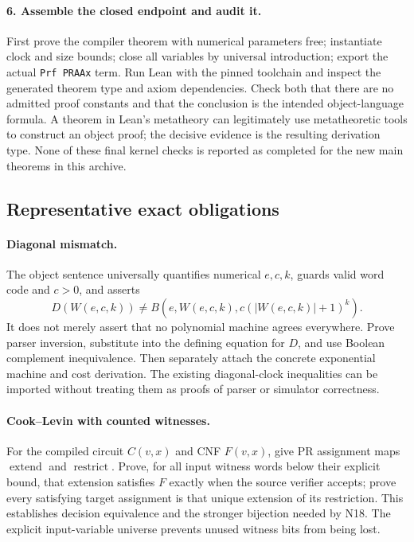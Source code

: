\paragraph{6. Assemble the closed endpoint and audit it.}
First prove the compiler theorem with numerical parameters free; instantiate clock and size bounds; close all variables by universal introduction; export the actual \texttt{Prf PRAAx} term. Run Lean with the pinned toolchain and inspect the generated theorem type and axiom dependencies. Check both that there are no admitted proof constants and that the conclusion is the intended object-language formula. A theorem in Lean's metatheory can legitimately use metatheoretic tools to construct an object proof; the decisive evidence is the resulting derivation type. None of these final kernel checks is reported as completed for the new main theorems in this archive.

\subsection{Representative exact obligations}
\paragraph{Diagonal mismatch.}
The object sentence universally quantifies numerical $e,c,k$, guards valid word code and $c>0$, and asserts
\[
 D(W(e,c,k))\ne B(e,W(e,c,k),c(|W(e,c,k)|+1)^k).
\]
It does not merely assert that no polynomial machine agrees everywhere. Prove parser inversion, substitute into the defining equation for $D$, and use Boolean complement inequivalence. Then separately attach the concrete exponential machine and cost derivation. The existing diagonal-clock inequalities can be imported without treating them as proofs of parser or simulator correctness.

\paragraph{Cook--Levin with counted witnesses.}
For the compiled circuit $C(v,x)$ and CNF $F(v,x)$, give PR assignment maps $\operatorname{extend}$ and $\operatorname{restrict}$. Prove, for all input witness words below their explicit bound, that extension satisfies $F$ exactly when the source verifier accepts; prove every satisfying target assignment is that unique extension of its restriction. This establishes decision equivalence and the stronger bijection needed by N18. The explicit input-variable universe prevents unused witness bits from being lost.

